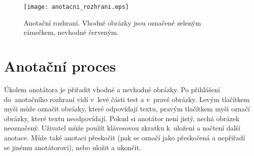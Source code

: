 \begin{figure}
  \centering
  \texttt{[image: anotacni\_rozhrani.eps]}
  \caption{Anotační rozhraní. Vhodné obrázky jsou označené zeleným rámečkem, nevhodné červeným.}
  \label{fig:anotacni_rozhrani}
\end{figure}

\section{Anotační proces}

Úkolem anotátora je přiřadit vhodné a nevhodné obrázky. Po přihlášení do~anotačního rozhraní vidí v~levé části test a v~pravé obrázky. Levým tlačítkem myši může označit obrázky, které odpovídají textu, pravým tlačítkem myši označí obrázky, které textu neodpovídají. Pokud si anotátor není jistý, nechá obrázek neoznačený. Uživatel může použít klávesovou zkratku  k~uložení a načtení další anotace. Může také anotaci přeskočit (pak se označí jako přeskočená a nepřiřadí se jinému anotátorovi), nebo uložit a ukončit.



